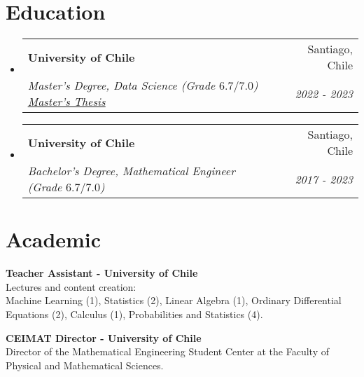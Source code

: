 \documentclass[letterpaper,11pt]{article}
\makeatletter
\newcommand{\resumeItem}[1]{
  \item\small{
    {#1 \vspace{-2pt}}
  }
}
\newcommand{\resumeSubheading}[4]{
  \vspace{-2pt}\item
    \begin{tabular*}{0.97\textwidth}[t]{l@{\extracolsep{\fill}}r}
      \textbf{#1} & #2 \\
      \textit{\small#3} & \textit{\small #4} \\
    \end{tabular*}\vspace{-7pt}
}
\newcommand{\resumeProjectHeading}[2]{
    \item
    \begin{tabular*}{0.97\textwidth}{l@{\extracolsep{\fill}}r}
      \small#1 & #2 \\
    \end{tabular*}\vspace{-7pt}
}
\newcommand{\resumeSubHeadingListStart}{\begin{itemize}[leftmargin=0.15in, label={}]}
\newcommand{\resumeSubHeadingListEnd}{\end{itemize}}
\newcommand{\resumeItemListStart}{\begin{itemize}}
\newcommand{\resumeItemListEnd}{\end{itemize}\vspace{-5pt}}
\makeatother
\begin{document}

\section{Education}
  \resumeSubHeadingListStart
    \resumeSubheading
      {University of Chile}{Santiago, Chile}
      {Master's Degree, Data Science (Grade $6.7/7.0$) \href{https://repositorio.uchile.cl/handle/2250/197408}{\underline{Master's Thesis}}}{2022 - 2023}
    \resumeSubheading
      {University of Chile}{Santiago, Chile}
      {Bachelor's Degree, Mathematical Engineer (Grade $6.7/7.0$)}{2017 - 2023}
  \resumeSubHeadingListEnd


 \section{Academic}
  \begin{itemize}[leftmargin=0.15in, label={}]
  \small{\item{
     \textbf{Teacher Assistant - University of Chile} \\
     Lectures and content creation:\\ Machine Learning (1), Statistics (2), Linear Algebra (1), Ordinary Differential Equations (2), Calculus (1), Probabilities and Statistics (4). \\
    }}
    \small{\item{
     \textbf{CEIMAT Director - University of Chile} \\
     Director of the Mathematical Engineering Student Center at the Faculty of Physical and Mathematical Sciences. 
    }}
 \end{itemize}
\end{document}
